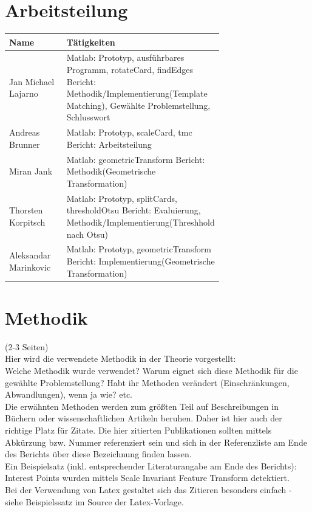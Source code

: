\documentclass[paper=A4, deutsch]{scrartcl}
\begin{document}
\section{Arbeitsteilung}
\begin{center}
  \begin{tabular}{ |l |p{0.7\linewidth} | }
    \hline
  Name & Tätigkeiten\\
    \hline
		Jan Michael Lajarno & Matlab: Prototyp, ausführbares Programm, rotateCard, findEdges \newline Bericht: Methodik/Implementierung(Template Matching), Gewählte Problemstellung, Schlusswort\\
		\hline
		Andreas Brunner & Matlab: Prototyp, scaleCard, tmc \newline Bericht: Arbeitsteilung\\
		\hline
		Miran Jank & Matlab: geometricTransform \newline Bericht: Methodik(Geometrische Transformation)\\
		\hline
		Thorsten Korpitsch & Matlab: Prototyp, splitCards, thresholdOtsu \newline Bericht: Evaluierung, Methodik/Implementierung(Threshhold nach Otsu)\\
		\hline
		Aleksandar Marinkovic & Matlab: Prototyp, geometricTransform \newline Bericht: Implementierung(Geometrische Transformation)\\ 
		\hline
  \end{tabular}
\end{center}


\section{Methodik}
(2-3 Seiten)\\
Hier wird die verwendete Methodik in der Theorie vorgestellt:\\
Welche Methodik wurde verwendet? Warum eignet sich diese Methodik für die gewählte Problemstellung? Habt ihr Methoden verändert (Einschränkungen, Abwandlungen), wenn ja wie? etc.\\
Die erwähnten Methoden werden zum größten Teil auf Beschreibungen in Büchern oder wissenschaftlichen Artikeln beruhen. Daher ist hier auch der richtige Platz für Zitate. Die hier zitierten Publikationen sollten mittels Abkürzung bzw. Nummer referenziert sein und sich in der Referenzliste am Ende des Berichts über diese Bezeichnung finden lassen.\\
Ein Beispielsatz (inkl. entsprechender Literaturangabe am Ende des Berichts): Interest Points wurden mittels Scale Invariant Feature Transform detektiert.\\
Bei der Verwendung von Latex gestaltet sich das Zitieren besonders einfach - siehe Beispielssatz im Source der Latex-Vorlage.\\
\end{document}

